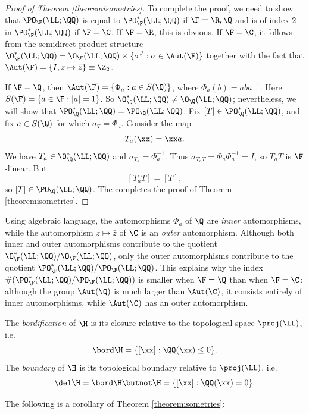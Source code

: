 \begin{proof}[Proof of Theorem \ref{theoremisometries}]
To complete the proof, we need to show that $\PO_\F(\LL;\QQ)$ is equal to $\PO_\F^*(\LL;\QQ)$ if $\F = \R,\Q$ and is of index $2$ in $\PO_\F^*(\LL;\QQ)$ if $\F = \C$. If $\F = \R$, this is obvious. If $\F = \C$, it follows from the semidirect product structure $\O_\F^*(\LL;\QQ) = \O_\F(\LL;\QQ) \ltimes \{\sigma^J : \sigma\in\Aut(\F)\}$ together with the fact that $\Aut(\F) = \{I,z\mapsto \bar z\} \equiv\Z_2$.

If $\F = \Q$, then $\Aut(\F) = \{\Phi_a : a\in S(\Q)\}$, where $\Phi_a(b) = aba^{-1}$. Here $S(\F) = \{a\in\F : |a| = 1\}$. So $\O_\Q^*(\LL;\QQ) \neq \O_\Q(\LL;\QQ)$; nevertheless, we will show that $\PO_\Q^*(\LL;\QQ) = \PO_\Q(\LL;\QQ)$. Fix $[T]\in \PO_\Q^*(\LL;\QQ)$, and fix $a\in S(\Q)$ for which $\sigma_T = \Phi_a$. Consider the map
\begin{equation}
\label{Tadef}
T_a(\xx) = \xx a.
\end{equation}
We have $T_a\in\O_\Q^*(\LL;\QQ)$ and $\sigma_{T_a} = \Phi_a^{-1}$. Thus $\sigma_{T_a T} = \Phi_a \Phi_a^{-1} = I$, so $T_a T$ is $\F$-linear. But
\[
[T_a T] = [T],
\]
so $[T]\in\PO_\Q(\LL;\QQ)$. The completes the proof of Theorem \ref{theoremisometries}.
\end{proof}

\begin{remark}
Using algebraic language, the automorphisms $\Phi_a$ of $\Q$ are \emph{inner} automorphisms, while the automorphism $z\mapsto \bar z$ of $\C$ is an \emph{outer} automorphism. Although both inner and outer automorphisms contribute to the quotient $\O_\F^*(\LL;\QQ)/\O_\F(\LL;\QQ)$, only the outer automorphisms contribute to the quotient $\PO_\F^*(\LL;\QQ)/\PO_\F(\LL;\QQ)$. This explains why the index $\#(\PO_\F^*(\LL;\QQ)/\PO_\F(\LL;\QQ))$ is smaller when $\F = \Q$ than when $\F = \C$: although the group $\Aut(\Q)$ is much larger than $\Aut(\C)$, it consists entirely of inner automorphisms, while $\Aut(\C)$ has an outer automorphism.
\end{remark}

\begin{definition}
The \emph{bordification} of $\H$ is its closure relative to the topological space $\proj(\LL)$, i.e.
\[
\bord\H = \{[\xx] : \QQ(\xx) \leq 0\}.
\]
The \emph{boundary} of $\H$ is its topological boundary relative to $\proj(\LL)$, i.e.
\[
\del\H = \bord\H\butnot\H = \{[\xx] : \QQ(\xx) = 0\}.
\]
\end{definition}

The following is a corollary of Theorem \ref{theoremisometries}:

